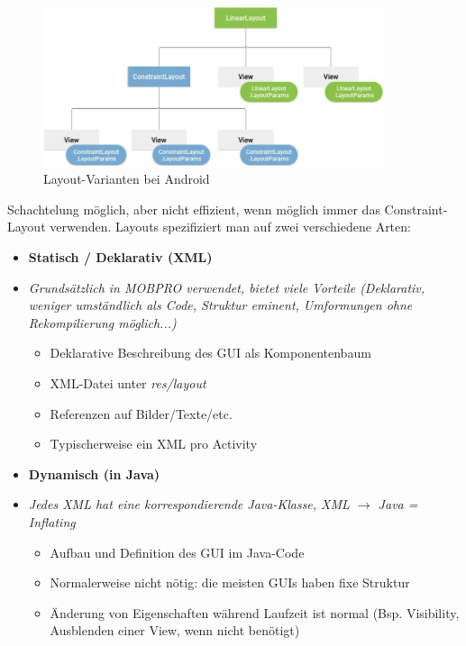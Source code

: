 \documentclass[a4paper]{article}
\begin{document}
\begin{figure}[htb!]
	\centering
	\includegraphics[width=10cm]{img/xml_layouts.jpg}
	\caption{Layout-Varianten bei Android}
	\label{fig:xmllayouts}
\end{figure}
\noindent
Schachtelung möglich, aber nicht effizient, wenn möglich immer das Constraint-Layout verwenden. Layouts spezifiziert man auf zwei verschiedene Arten:
\begin{itemize}
	\item \textbf{Statisch / Deklarativ (XML)}
	\item \textit{Grundsätzlich in MOBPRO verwendet, bietet viele Vorteile (Deklarativ, weniger umständlich als Code, Struktur eminent, Umformungen ohne Rekompilierung möglich...)}
		\begin{itemize}
			\item Deklarative Beschreibung des GUI als Komponentenbaum
			\item XML-Datei unter \textit{res/layout}
			\item Referenzen auf Bilder/Texte/etc.
			\item Typischerweise ein XML pro Activity
		\end{itemize}
	\item \textbf{Dynamisch (in Java)}
	\item \textit{Jedes XML hat eine korrespondierende Java-Klasse, XML $\rightarrow$ Java = Inflating}
		\begin{itemize}
			\item Aufbau und Definition des GUI im Java-Code
			\item Normalerweise nicht nötig: die meisten GUIs haben fixe Struktur
			\item Änderung von Eigenschaften während Laufzeit ist normal (Bsp. Visibility, Ausblenden einer View, wenn nicht benötigt)
		\end{itemize}
\end{itemize}
\newpage
\end{document}
